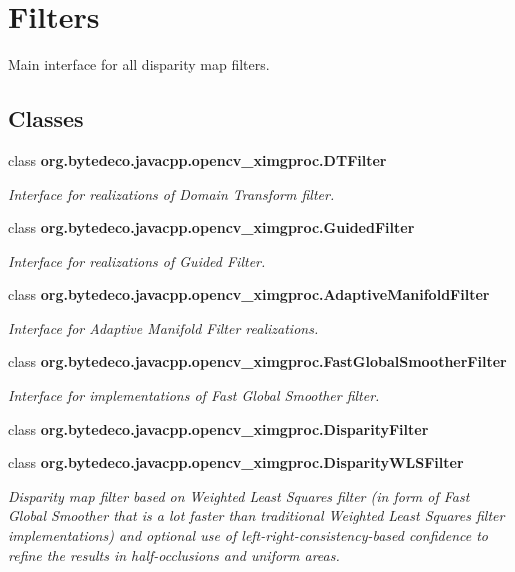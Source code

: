 \hypertarget{group__ximgproc__filters}{}\section{Filters}
\label{group__ximgproc__filters}


Main interface for all disparity map filters.  


\subsection*{Classes}
\begin{DoxyCompactItemize}
\item 
class {\bfseries org.\+bytedeco.\+javacpp.\+opencv\+\_\+ximgproc.\+D\+T\+Filter}
\begin{DoxyCompactList}\small\item\em Interface for realizations of Domain Transform filter. \end{DoxyCompactList}\item 
class {\bfseries org.\+bytedeco.\+javacpp.\+opencv\+\_\+ximgproc.\+Guided\+Filter}
\begin{DoxyCompactList}\small\item\em Interface for realizations of Guided Filter. \end{DoxyCompactList}\item 
class {\bfseries org.\+bytedeco.\+javacpp.\+opencv\+\_\+ximgproc.\+Adaptive\+Manifold\+Filter}
\begin{DoxyCompactList}\small\item\em Interface for Adaptive Manifold Filter realizations. \end{DoxyCompactList}\item 
class {\bfseries org.\+bytedeco.\+javacpp.\+opencv\+\_\+ximgproc.\+Fast\+Global\+Smoother\+Filter}
\begin{DoxyCompactList}\small\item\em Interface for implementations of Fast Global Smoother filter. \end{DoxyCompactList}\item 
class {\bfseries org.\+bytedeco.\+javacpp.\+opencv\+\_\+ximgproc.\+Disparity\+Filter}
\item 
class {\bfseries org.\+bytedeco.\+javacpp.\+opencv\+\_\+ximgproc.\+Disparity\+W\+L\+S\+Filter}
\begin{DoxyCompactList}\small\item\em Disparity map filter based on Weighted Least Squares filter (in form of Fast Global Smoother that is a lot faster than traditional Weighted Least Squares filter implementations) and optional use of left-\/right-\/consistency-\/based confidence to refine the results in half-\/occlusions and uniform areas. \end{DoxyCompactList}\item 

\end{DoxyCompactItemize}
